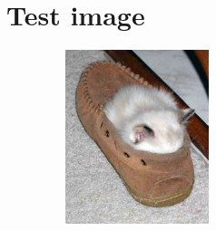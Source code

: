 \documentclass{article}
\begin{document}
\section{Test image}

\includegraphics[height=2in, width = 3in]{kittenshoes.bmp}
\end{document}
